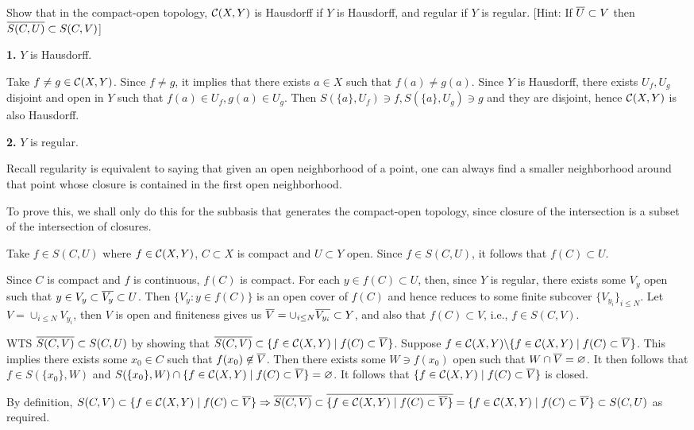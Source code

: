 \documentclass[a4paper, 10pt]{article}
\begin{document}
\begin{problem} [46.6 \done]
    Show that in the compact-open topology, $\mathcal{C}(X, Y)$ is Hausdorff if $Y$ is Hausdorff, and regular if $Y$ is regular. [Hint: If $\overline{U} \subset V$ then $\overline{S(C, U)} \subset S(C, V)$]
\end{problem}
\begin{solution}
    \textbf{1.} $Y$ is Hausdorff.

    Take $f \neq g \in \mathcal{C}(X, Y)$. Since $f \neq g$, it implies that there exists $a \in X$ such that $f(a) \neq g(a)$. Since $Y$ is Hausdorff, there exists $U_f, U_g$ disjoint and open in $Y$ such that $f(a) \in U_f, g(a) \in U_g$. Then $S(\{a\}, U_f) \ni f, S(\{a\}, U_g) \ni g$ and they are disjoint, hence $\mathcal{C}(X, Y)$ is also Hausdorff.

    \textbf{2.} $Y$ is regular.

    Recall regularity is equivalent to saying that given an open neighborhood of a point, one can always find a smaller neighborhood around that point whose closure is contained in the first open neighborhood.

    To prove this, we shall only do this for the subbasis that generates the compact-open topology, since closure of the intersection is a subset of the intersection of closures.

    Take $f \in S(C, U)$ where $f \in \mathcal{C}(X, Y)$, $C \subset X$ is compact and $U \subset Y$ open. Since $f \in S(C, U)$, it follows that $f(C) \subset U$.

    Since $C$ is compact and $f$ is continuous, $f(C)$ is compact. For each $y \in f(C) \subset U$, then, since $Y$ is regular, there exists some $V_y$ open such that $y \in V_y \subset \overline{V_y} \subset U$. Then $\{V_y : y \in f(C)\}$ is an open cover of $f(C)$ and hence reduces to some finite subcover $\{V_{y_i}\}_{i \leq N}$. Let $V = \cup_{i \leq N} V_{y_i}$, then $V$ is open and finiteness gives us $\overline{V} = \cup_{i \leq N} \overline{V_{y_i}} \subset Y$, and also that $f(C) \subset V$, i.e., $f \in S(C, V)$.

    WTS $\overline{S(C, V)} \subset S(C, U)$ by showing that $\overline{S(C, V)} \subset \{f \in \mathcal{C}(X, Y) \mid f(C) \subset \overline{V}\}$. Suppose $f \in \mathcal{C}(X, Y) \backslash \{f \in \mathcal{C} (X, Y) \mid f(C) \subset \overline{V}\}$. This implies there exists some $x_0 \in C$ such that $f(x_0) \not \in \overline{V}$. Then there exists some $W \ni f(x_0)$ open such that $W \cap \overline{V} = \varnothing$. It then follows that $f \in S(\{x_0\}, W)$ and $S(\{x_0\}, W) \cap \{f \in \mathcal{C}(X, Y) \mid f(C) \subset \overline{V}\} = \varnothing$. It follows that $\{f \in \mathcal{C}(X, Y) \mid f(C) \subset \overline{V}\}$ is closed.

    By definition, $S(C, V) \subset \{f \in \mathcal{C}(X, Y) \mid f(C) \subset \overline{V}\} \Rightarrow \overline{S(C, V)} \subset \overline{\{f \in \mathcal{C}(X, Y) \mid f(C) \subset \overline{V}\}} = \{f \in \mathcal{C}(X, Y) \mid f(C) \subset \overline{V}\} \subset S(C, U)$ as required.
\end{solution}
\end{document}
